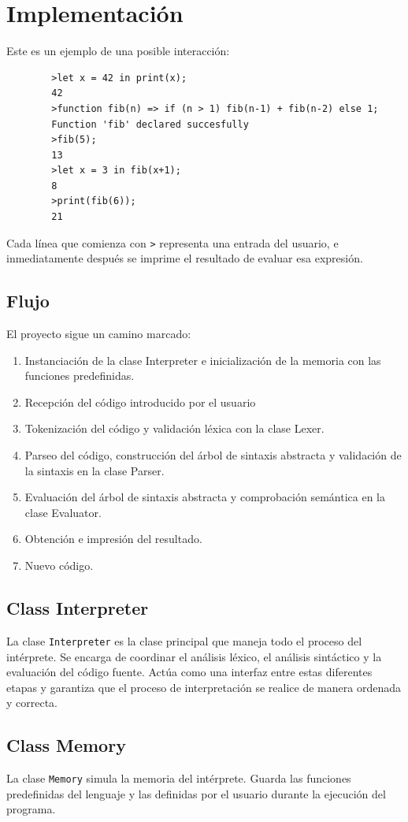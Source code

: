\documentclass[12pt,a4paper]{article}
\begin{document}
\section{Implementación}\label{sub:impl}
Este es un ejemplo de una posible interacción:
	\begin{verbatim}
		>let x = 42 in print(x);
		42
		>function fib(n) => if (n > 1) fib(n-1) + fib(n-2) else 1;
		Function 'fib' declared succesfully
		>fib(5);
		13
		>let x = 3 in fib(x+1);
		8
		>print(fib(6));
		21
	\end{verbatim}
Cada línea que comienza con \texttt{>} representa una entrada del usuario, e inmediatamente después se imprime el resultado de evaluar esa expresión.
\subsection{Flujo}\label{sub:flow}
El proyecto sigue un camino marcado:
\begin{enumerate}
	\item Instanciación de la clase Interpreter e inicialización de la memoria con las funciones predefinidas.
	\item Recepción del código introducido por el usuario
	\item Tokenización del código y validación léxica con la clase Lexer.
	\item Parseo del código, construcción del árbol de sintaxis abstracta y validación de la sintaxis en la clase Parser.
	\item Evaluación del árbol de sintaxis abstracta y comprobación semántica en la clase Evaluator.
	\item Obtención e impresión del resultado.
	\item Nuevo código.
\end{enumerate}

\subsection{Class Interpreter}
La clase \texttt{Interpreter} es la clase principal que maneja todo el proceso del intérprete. Se encarga de coordinar el análisis léxico, el análisis sintáctico y la evaluación del código fuente. Actúa como una interfaz entre estas diferentes etapas y garantiza que el proceso de interpretación se realice de manera ordenada y correcta.
\subsection{Class Memory}
La clase \texttt{Memory} simula la memoria del intérprete. Guarda las funciones predefinidas del lenguaje y las definidas por el usuario durante la ejecución del programa.
\end{document}
